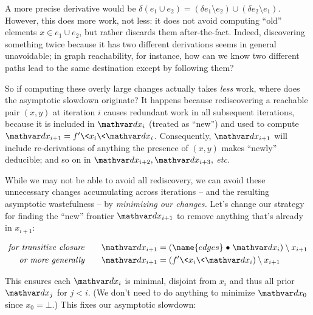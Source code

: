 A more precise derivative would be $\delta(e_1 \cup e_2) = (\delta e_1 \setminus e_2) \cup (\delta e_2 \setminus e_1)$.
%
However, this does more work, not less: it does not avoid computing ``old'' elements $x \in e_1 \cup e_2$, but rather discards them after-the-fact.
%
Indeed, discovering something twice because it has two different derivations seems in general unavoidable; in graph reachability, for instance, how can we know two different paths lead to the same destination except by following them?

So if computing these overly large changes actually takes \emph{less} work, where does the asymptotic slowdown originate?
%
It happens because rediscovering a reachable pair $(x,y)$ at iteration $i$ causes redundant work in all subsequent iterations, because it is included in $\dx_i$ (treated as ``new'') and used to compute $\dx_{i+1} = f'\<x_i\<\dx_i$.
%
Consequently, $\dx_{i+1}$ will include re-derivations of anything the presence of $(x,y)$ makes ``newly'' deducible; and so on in $\dx_{i+2}, \dx_{i+3},$ \emph{etc.}

While we may not be able to avoid all rediscovery, we can avoid these unnecessary changes accumulating across iterations -- and the resulting asymptotic wastefulness -- by \emph{minimizing our changes.}
%
Let's change our strategy for finding the ``new'' frontier $\dx_{i+1}$ to remove anything that's already in $x_{i+1}$:

\begin{align*}
  \textit{for transitive closure}
  \qquad
  \dx_{i+1} &= (\name{edges} \relcomp \dx_i) \setminus x_{i+1}
  \\
  \textit{or more generally}
  \qquad
  \dx_{i+1} &= (f' \<x_i \<\dx_i) \setminus x_{i+1}
\end{align*}

\noindent
This ensures each $\dx_i$ is minimal, disjoint from $x_i$ and thus all prior $\dx_j$ for $j < i$. (We don't need to do anything to minimize $\dx_0$ since $x_0 = \bot$.) This fixes our asymptotic slowdown:

\nopagebreak[3]
\begin{center}
  \small\sffamily
\end{center}

